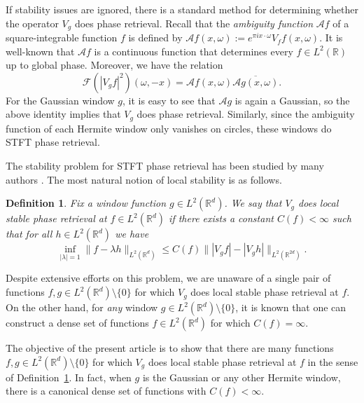 \documentclass[11pt]{amsart}
\newtheorem{definition}[theorem]{Definition}
\theoremstyle{remark}
\begin{document}
If stability issues are ignored, there is a standard method for determining whether the operator $V_g$ does phase retrieval. Recall that the \emph{ambiguity function} $\mathcal{A}f$  of a square-integrable function $f$ is defined by $\mathcal{A}f(x,\omega):=e^{\pi ix\cdot \omega} V_ff(x,\omega)$. It is well-known that $\mathcal{A}f$ is a continuous function that determines every $f\in L^2(\mathbb{R})$ up to global phase. Moreover, we have the relation 
\begin{equation}\label{Ambiguity to STFT}
    \mathcal{F}\left( |V_g f|^2\right)(\omega,-x)=\mathcal{A}f(x,\omega) \overline{\mathcal{A}g(x,\omega)}.
\end{equation}
For the Gaussian window $g$, it is easy to see that $\mathcal{A}g$ is again a Gaussian, so the above identity implies that $V_g$ does phase retrieval. Similarly, since the ambiguity function of each Hermite window only vanishes on circles, these windows do STFT phase retrieval.
 \vspace{0.5em}

The stability problem for STFT phase retrieval has been studied by many authors \cite{alaifari2019Stable,alaifari2025cheeger,fuhr2025cheeger,MR4709358,Grohs2019Stable,MR4404785,MR5010357}. The most natural notion of local stability is as follows.
\begin{definition}\label{defn of local stability}
    Fix a window function $g\in L^2(\mathbb{R}^d)$. We say that $V_g$ does \emph{local stable phase retrieval at $f\in L^2(\mathbb{R}^d)$} if there exists a constant $C(f)<\infty$ such that for all $h\in L^2(\mathbb{R}^d)$ we have
    \begin{equation}\label{SPR local V_g}
        \inf_{|\lambda|=1}\|f-\lambda h\|_{L^2(\mathbb{R}^d)}\leq C(f) \| |V_g f|-|V_g h|\|_{L^2(\mathbb{R}^{2d})}.
    \end{equation}
\end{definition}
Despite extensive efforts on this problem, we are unaware of a single pair of functions $f,g\in L^2(\mathbb{R}^d)\setminus\{0\}$ for which $V_g$ does local stable phase retrieval at $f$. On the other hand, for \emph{any} window $g\in L^2(\mathbb{R}^d)\setminus\{0\}$, it is known \cite{alaifari2025cheeger,Alharbi2024Locality} that one can construct a dense set of functions $f\in L^2(\mathbb{R}^d)$ for which $C(f)=\infty$. 
 \vspace{0.5em}

The objective of the present article is to show that there are many functions $f,g\in L^2(\mathbb{R}^d)\setminus\{0\}$ for which $V_g$ does local stable phase retrieval at $f$ in the sense of Definition~\ref{defn of local stability}. In fact, when $g$ is the Gaussian or any other Hermite window, there is a  canonical dense set of functions with $C(f)<\infty.$
\end{document}
